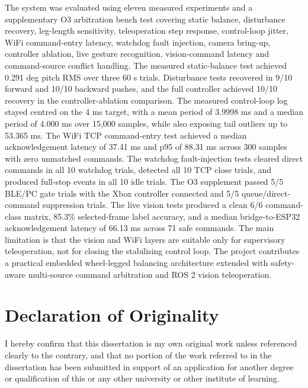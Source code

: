 \documentclass[12pt, a4paper]{article}
\begin{document}
The system was evaluated using eleven measured experiments and a supplementary O3 arbitration bench test covering static balance, disturbance recovery, leg-length sensitivity, teleoperation step response, control-loop jitter, WiFi command-entry latency, watchdog fault injection, camera bring-up, controller ablation, live gesture recognition, vision-command latency and command-source conflict handling. The measured static-balance test achieved 0.291 deg pitch RMS over three 60 s trials. Disturbance tests recovered in 9/10 forward and 10/10 backward pushes, and the full controller achieved 10/10 recovery in the controller-ablation comparison. The measured control-loop log stayed centred on the 4 ms target, with a mean period of 3.9998 ms and a median period of 4.000 ms over 15,000 samples, while also exposing tail outliers up to 53.365 ms. The WiFi TCP command-entry test achieved a median acknowledgement latency of 37.41 ms and p95 of 88.31 ms across 300 samples with zero unmatched commands. The watchdog fault-injection tests cleared direct commands in all 10 watchdog trials, detected all 10 TCP close trials, and produced full-stop events in all 10 idle trials. The O3 supplement passed 5/5 BLE/PC gate trials with the Xbox controller connected and 5/5 queue/direct-command suppression trials. The live vision tests produced a clean 6/6 command-class matrix, 85.3\% selected-frame label accuracy, and a median bridge-to-ESP32 acknowledgement latency of 66.13 ms across 71 safe commands. The main limitation is that the vision and WiFi layers are suitable only for supervisory teleoperation, not for closing the stabilising control loop. The project contributes a practical embedded wheel-legged balancing architecture extended with safety-aware multi-source command arbitration and ROS 2 vision teleoperation.

\newpage
\section*{Declaration of Originality}
I hereby confirm that this dissertation is my own original work unless referenced clearly to the contrary, and that no portion of the work referred to in the dissertation has been submitted in support of an application for another degree or qualification of this or any other university or other institute of learning.

\newpage
\end{document}

